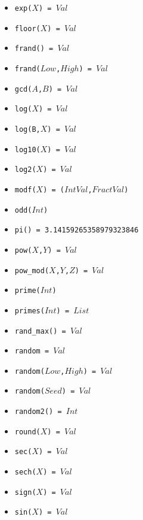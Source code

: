 \documentclass[10pt]{article}
\begin{document}
\begin{multicols}{2}
\begin{scriptsize}
\begin{itemize}
   \item \texttt{exp($X$) = $Val$} 
   \item \texttt{floor($X$) = $Val$} 
   \item \texttt{frand() = $Val$}
   \item \texttt{frand($Low$,$High$) = $Val$}    
   \item \texttt{gcd($A$,$B$) = $Val$} 
   \item \texttt{log($X$) = $Val$}
   \item \texttt{log(B,$X$) = $Val$} 
   \item \texttt{log10($X$) = $Val$} 
   \item \texttt{log2($X$) = $Val$} 
   \item \texttt{modf($X$) = ($IntVal$,$FractVal$)} 
   \item \texttt{odd($Int$)} 
   \item \texttt{pi() = 3.14159265358979323846} 
   \item \texttt{pow($X$,$Y$) = $Val$}
   \item \texttt{pow\_mod($X$,$Y$,$Z$) = $Val$}
   \item \texttt{prime($Int$)} 
   \item \texttt{primes($Int$) = $List$} 
   \item \texttt{rand\_max() = $Val$} 
   \item \texttt{random = $Val$} 
   \item \texttt{random($Low$,$High$) = $Val$} 
   \item \texttt{random($Seed$) = $Val$} 
   \item \texttt{random2() = $Int$} 
   \item \texttt{round($X$) = $Val$}
   \item \texttt{sec($X$) = $Val$}
   \item \texttt{sech($X$) = $Val$} 
   \item \texttt{sign($X$) = $Val$}  
   \item \texttt{sin($X$) = $Val$} 

\end{itemize}
\end{scriptsize}
\end{multicols}
\end{document}
